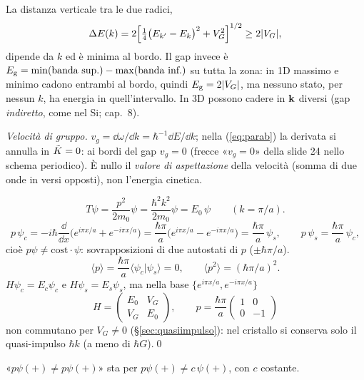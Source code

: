 \documentclass[11pt,a4paper]{article}
\begin{document}
\begin{osservazione}
La distanza verticale tra le due radici,
\[
\Delta E(k)=2\Bigl[\tfrac14\bigl(E_{k'}-E_k\bigr)^2+V_G^2\Bigr]^{1/2}\ge2|V_G|,
\]
dipende da $k$ ed è minima al bordo. Il gap invece è $E_{\mathrm g}=\min(\text{banda sup.})-\max(\text{banda inf.})$ su tutta la zona: in 1D massimo e minimo cadono entrambi al bordo, quindi $E_{\mathrm g}=2|V_G|$, ma
nessuno stato, per nessun $k$, ha energia in quell'intervallo. In 3D possono cadere in $\mathbf k$ diversi (gap \emph{indiretto}, come nel Si; cap.~8).
\end{osservazione}

\emph{Velocità di gruppo.} $v_g=\dd\omega/\dd k=\hbar^{-1}\dd E/\dd k$; nella (\ref{eq:parab}) la derivata si annulla in $\tilde K=0$: ai bordi del gap $v_g=0$ (frecce «$v_g=0$» della slide 24 nello schema
periodico). È nullo il \emph{valore di aspettazione} della velocità (somma di due onde in versi opposti), non l'energia cinetica.
\begin{dimostrazione}
\[
T\psi=\frac{p^2}{2m_0}\psi=\frac{\hbar^2k^2}{2m_0}\psi=E_0\,\psi\qquad(k=\pi/a).
\]
\[
p\,\psi_c=-i\hbar\frac{\dd}{\dd x}\bigl(e^{i\pi x/a}+e^{-i\pi x/a}\bigr)=\frac{\hbar\pi}a\bigl(e^{i\pi x/a}-e^{-i\pi x/a}\bigr)=\frac{\hbar\pi}a\,\psi_s,\qquad
p\,\psi_s=\frac{\hbar\pi}a\,\psi_c,
\]
cioè $p\psi\ne\text{cost}\cdot\psi$: sovrapposizioni di due autostati di $p$ ($\pm\hbar\pi/a$).
\[
\langle p\rangle=\frac{\hbar\pi}a\langle\psi_c|\psi_s\rangle=0,\qquad\langle p^2\rangle=(\hbar\pi/a)^2 .
\]
$H\psi_c=E_c\psi_c$ e $H\psi_s=E_s\psi_s$, ma nella base $\{e^{i\pi x/a},e^{-i\pi x/a}\}$
\[
H=\begin{pmatrix}E_0&V_G\\V_G&E_0\end{pmatrix},\qquad p=\frac{\hbar\pi}a\begin{pmatrix}1&0\\0&-1\end{pmatrix}
\]
non commutano per $V_G\ne0$ (§\ref{sec:quasiimpulso}): nel cristallo si conserva solo il quasi-impulso $\hbar k$ (a meno di $\hbar G$).\qed
\end{dimostrazione}
\begin{osservazione}
«$p\psi(+)\neq p\psi(+)$» sta per $p\psi(+)\neq c\,\psi(+)$, con $c$ costante.
\end{osservazione}
\end{document}

